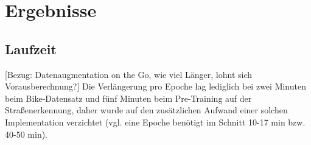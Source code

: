 \chapter{Ergebnisse} \label{sec:results}

\section{Laufzeit}

[Bezug: Datenaugmentation on the Go, wie viel Länger, lohnt sich Vorausberechnung?]
Die Verlängerung pro Epoche lag lediglich bei zwei Minuten beim Bike-Datensatz und fünf Minuten beim Pre-Training auf der 
Straßenerkennung, daher wurde auf den zusätzlichen Aufwand einer solchen Implementation verzichtet 
(vgl. eine Epoche benötigt im Schnitt 10-17 min bzw. 40-50 min). 





		

